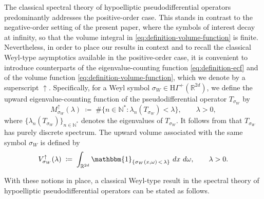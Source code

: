 \documentclass[a4paper,12pt]{article}
\newtheorem{theorem}{Theorem}%
\newcommand{\N}{\mathbb{N}}
\newcommand{\R}{\mathbb{R}}
\newcommand{\diff}{\mathop{}\!d}
\newcommand{\ecfup}{M^{\uparrow}}
\newcommand{\volup}{V^{\uparrow}}
\newcommand{\hypoposclass}{\mathrm{H}\Gamma^+}
\begin{document}
The classical spectral theory of hypoelliptic pseudodifferential operators
predominantly addresses the 
positive-order case. %
This stands in contrast to the negative-order setting of the present paper, where the symbols of
interest decay at infinity, so that the volume integral in
\eqref{eq:definition-volume-function} is finite.
Nevertheless, in order to place our results in context and to recall the
classical Weyl-type asymptotics available in the 
positive-order case, it is
convenient to introduce counterparts of the eigenvalue-counting function
\eqref{eq:definition-ecf} and of the volume function
\eqref{eq:definition-volume-function}, which we denote by a superscript
$\uparrow$. 
Specifically, for a Weyl symbol $\sigma_W\in\hypoposclass(\R^{2d})$, we define the
upward eigenvalue-counting function of the pseudodifferential operator
$T_{\sigma_W}$ by
\[
    \ecfup_{\sigma_W}(\lambda)
    \;\coloneqq\;
    \#\bigl\{n\in\N^* : \lambda_n(T_{\sigma_W}) < \lambda\bigr\},
    \qquad \lambda>0,
\]
where $\{\lambda_n(T_{\sigma_W})\}_{n\in\N^*}$
denotes the eigenvalues
of $T_{\sigma_W}$.
It follows from \cite[Corollary~23.3 and Theorem~26.3]{shubin_pseudodifferential_2001}
that $T_{\sigma_W}$ has purely discrete spectrum.
The upward volume associated with the same symbol $\sigma_W$ is defined by
\begin{equation}\label{eq:definition-upward-volume}
    \volup_{\sigma_W}(\lambda)
    \;\coloneqq\;
    \int_{\R^{2d}} \mathbbm{1}_{\{\sigma_W(x,\omega) \, < \, \lambda\}}
    \,\diff x\,\diff\omega,
    \qquad \lambda>0.
\end{equation}

With these notions in place, a classical Weyl-type result in the spectral theory
of hypoelliptic pseudodifferential operators can be stated as follows.

\end{document}
